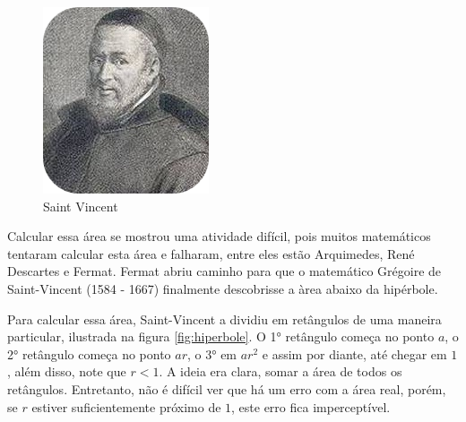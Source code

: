 \begin{figure}
    \setlength{\intextsep}{0pt}
    \vspace{-1.5em} 
    \centering
    \includegraphics[width=\linewidth]{img/SaintVincent.png}
    \caption*{Saint Vincent}
\end{figure}

Calcular essa área se mostrou uma atividade difícil, pois muitos matemáticos tentaram calcular esta área e falharam, entre eles estão Arquimedes, René Descartes e Fermat. Fermat abriu caminho para que o matemático Grégoire de Saint-Vincent (1584 - 1667) finalmente descobrisse a àrea abaixo da hipérbole.

Para calcular essa área, Saint-Vincent a dividiu em retângulos de uma maneira particular, ilustrada na figura \ref{fig:hiperbole}.
O 1° retângulo começa no ponto $a$, o 2° retângulo começa no ponto $ar$, o 3° em $ar^2$ e assim por diante, até chegar em $1$, além disso, note que $r < 1$. A ideia era clara, somar a área de todos os retângulos. Entretanto, não é difícil ver que há um erro com a área real, porém, se $r$ estiver suficientemente próximo de $1$, este erro fica imperceptível.

